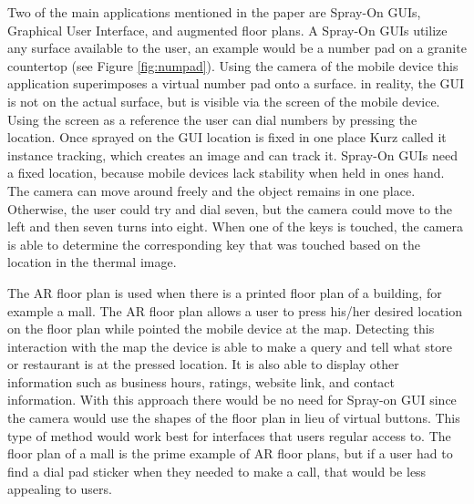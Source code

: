 \documentclass{sig-alternate}
\begin{document}
Two of the main applications mentioned in the paper are Spray-On GUIs, Graphical User Interface, and augmented floor plans. A Spray-On GUIs utilize any surface available to the user, an example would be a number pad on a granite countertop (see Figure \ref{fig:numpad}). Using the camera of the mobile device this application superimposes a virtual number pad onto a surface. in reality, the GUI is not on the actual surface, but is visible via the screen of the mobile device. Using the screen as a reference the user can dial numbers by pressing the location. Once sprayed on the GUI location is fixed in one place Kurz called it instance tracking, which creates an image and can track it. Spray-On GUIs need a fixed location, because mobile devices lack stability when held in ones hand. The camera can move around freely and the object remains in one place. Otherwise, the user could try and dial seven, but the camera could move to the left and then seven turns into eight. When one of the keys is touched, the camera is able to determine the corresponding key that was touched based on the location in the thermal image. 

The AR floor plan is used when there is a printed floor plan of a building, for example a mall. The AR floor plan allows a user to press his/her desired location on the floor plan while pointed the mobile device at the map. Detecting this interaction with the map the device is able to make a query and tell what store or restaurant is at the pressed location. It is also able to display other information such as business hours, ratings, website link, and contact information. With this approach there would be no need for Spray-on GUI since the camera would use the shapes of the floor plan in lieu of virtual buttons. This type of method would work best for interfaces that users regular access to. The floor plan of a mall is the prime example of AR floor plans, but if a user had to find a dial pad sticker when they needed to make a call, that would be less appealing to users.      
\end{document}
